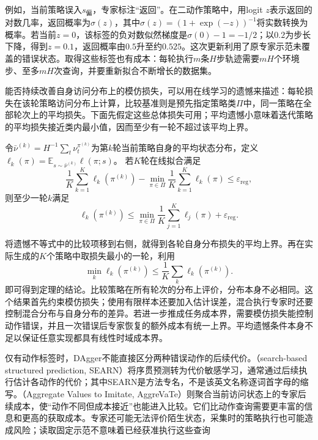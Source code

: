 例如，当前策略误入$s_{\text{偏}}$，专家标注“返回”。在二动作策略中，用logit $z$表示返回的对数几率，返回概率为$\sigma(z)$，其中$\sigma(z)=(1+\exp(-z))^{-1}$将实数转换为概率。若当前$z=0$，该标签的负对数似然梯度是$\sigma(0)-1=-1/2$；以$0.2$为步长下降，得到$z=0.1$，返回概率由$0.5$升至约$0.525$。这次更新利用了原专家示范未覆盖的错误状态。取得这些标签也有成本：每轮执行$m$条$H$步轨迹需要$mH$个环境步、至多$mH$次查询，并要重新拟合不断增长的数据集。

能否持续改善自身访问分布上的模仿损失，可以用在线学习的遗憾来描述：每轮损失在该轮策略访问分布上计算，比较基准则是预先指定策略类$\Pi$中，同一策略在全部轮次上的平均损失。下面先假定这些总体损失可用；平均遗憾小意味着迭代策略的平均损失接近类内最小值，因而至少有一轮不超过该平均上界。

\begin{theorem}[理想化DAgger的无遗憾归约]
  \label{thm:rl-reward-dagger}
  令$\bar\nu^{(k)}=H^{-1}\sum_t\nu_t^{\pi^{(k)}}$为第$k$轮当前策略自身的平均状态分布，定义
  $\ell_k(\pi)=\mathbb E_{s\sim\bar\nu^{(k)}}\ell(\pi;s)$。
  若$K$轮在线拟合满足
  \[
    \frac1K\sum_{k=1}^K\ell_k(\pi^{(k)})
    -\min_{\pi\in\Pi}\frac1K\sum_{k=1}^K\ell_k(\pi)
    \leq\varepsilon_{\mathrm{reg}},
  \]
  则至少一轮$k$满足
  \[
    \ell_k(\pi^{(k)})
    \leq\min_{\pi\in\Pi}\frac1K\sum_{j=1}^K\ell_j(\pi)
        +\varepsilon_{\mathrm{reg}}.
  \]
\end{theorem}

将遗憾不等式中的比较项移到右侧，就得到各轮自身分布损失的平均上界。再在实际生成的$K$个策略中取损失最小的一轮，利用
\[
  \min_k\ell_k(\pi^{(k)})
  \leq\frac1K\sum_k\ell_k(\pi^{(k)}).
\]
即可得到定理的结论。比较策略在所有轮次的分布上评价，分布本身不必相同。这个结果首先约束模仿损失；使用有限样本还要加入估计误差，混合执行专家时还要控制混合分布与自身分布的差异。若进一步推成任务成本界，需要模仿损失能控制动作错误，并且一次错误后专家恢复的额外成本有统一上界。平均遗憾条件本身不足以保证任意实现都具有线性时域成本界。

仅有动作标签时，DAgger不能直接区分两种错误动作的后续代价。（search-based structured prediction, SEARN）将序贯预测转为代价敏感学习，通常通过后续执行估计各动作的代价；其中SEARN是方法专名，不是该英文名称逐词首字母的缩写。（Aggregate Values to Imitate, AggreVaTe）则聚合当前访问状态上的专家后续成本，使“动作不同但成本接近”也能进入比较。它们比动作查询需要更丰富的信息和更高的获取成本。专家还可能无法评价陌生状态，采集时的策略执行也可能造成风险；读取固定示范不意味着已经获准执行这些查询

